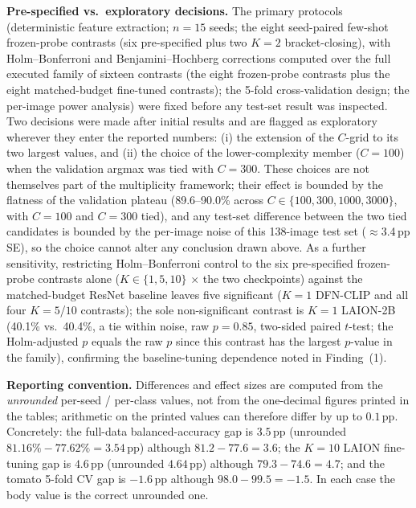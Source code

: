 \documentclass[10pt,a4paper]{article}
\begin{document}
\textbf{Pre-specified vs.\ exploratory decisions.} The primary protocols (deterministic feature extraction; $n=15$ seeds; the eight seed-paired few-shot frozen-probe contrasts (six pre-specified plus two $K{=}2$ bracket-closing), with Holm--Bonferroni and Benjamini--Hochberg corrections computed over the full executed family of sixteen contrasts (the eight frozen-probe contrasts plus the eight matched-budget fine-tuned contrasts); the 5-fold cross-validation design; the per-image power analysis) were fixed before any test-set result was inspected. Two decisions were made after initial results and are flagged as exploratory wherever they enter the reported numbers: (i) the extension of the $C$-grid to its two largest values, and (ii) the choice of the lower-complexity member ($C{=}100$) when the validation argmax was tied with $C{=}300$. These choices are not themselves part of the multiplicity framework; their effect is bounded by the flatness of the validation plateau (89.6--90.0\% across $C\in\{100,300,1000,3000\}$, with $C{=}100$ and $C{=}300$ tied), and any test-set difference between the two tied candidates is bounded by the per-image noise of this 138-image test set ($\approx$3.4\,pp SE), so the choice cannot alter any conclusion drawn above. As a further sensitivity, restricting Holm--Bonferroni control to the six pre-specified frozen-probe contrasts alone ($K\in\{1,5,10\}$ $\times$ the two checkpoints) against the matched-budget ResNet baseline leaves five significant ($K{=}1$ DFN-CLIP and all four $K{=}5$/$10$ contrasts); the sole non-significant contrast is $K{=}1$ LAION-2B (40.1\% vs.\ 40.4\%, a tie within noise, raw $p=0.85$, two-sided paired $t$-test; the Holm-adjusted $p$ equals the raw $p$ since this contrast has the largest $p$-value in the family), confirming the baseline-tuning dependence noted in Finding~(1).

 \textbf{Reporting convention.} Differences and effect sizes are computed from the \emph{unrounded} per-seed / per-class values, not from the one-decimal figures printed in the tables; arithmetic on the printed values can therefore differ by up to $0.1$\,pp. Concretely: the full-data balanced-accuracy gap is $3.5$\,pp (unrounded $81.16\% - 77.62\% = 3.54$\,pp) although $81.2 - 77.6 = 3.6$; the $K{=}10$ LAION fine-tuning gap is $4.6$\,pp (unrounded $4.64$\,pp) although $79.3 - 74.6 = 4.7$; and the tomato 5-fold CV gap is $-1.6$\,pp although $98.0 - 99.5 = -1.5$. In each case the body value is the correct unrounded one.

\end{document}
